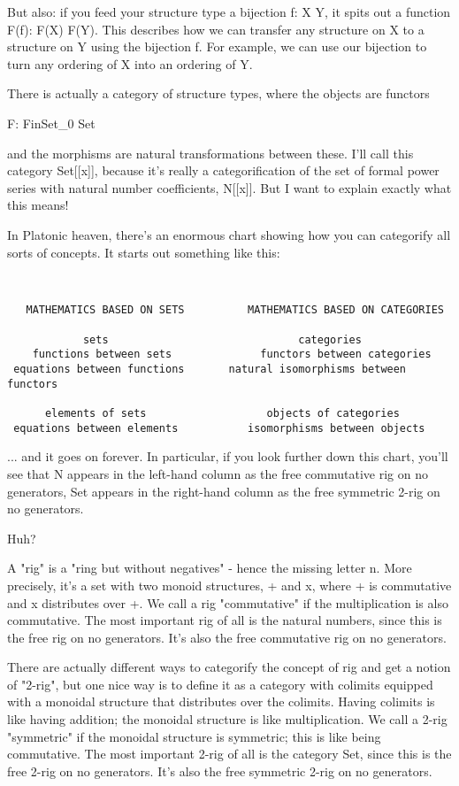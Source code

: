 But also: if you feed your structure type a bijection f: X \to  Y,
it spits out a function F(f): F(X) \to  F(Y).  This describes how
we can transfer any structure on X to a structure on Y using the
bijection f.  For example, we can use our bijection to turn any 
ordering of X into an ordering of Y.

There is actually a category of structure types, where the objects 
are functors 

F: FinSet_{0} \to  Set

and the morphisms are natural transformations between these.   I'll 
call this category Set[[x]], because it's really a categorification of 
the set of formal power series with natural number coefficients, N[[x]]. 
But I want to explain exactly what this means!

In Platonic heaven, there's an enormous chart showing how you can
categorify all sorts of concepts.  It starts out something like this:


\begin{verbatim}


   MATHEMATICS BASED ON SETS          MATHEMATICS BASED ON CATEGORIES

            sets                              categories
    functions between sets              functors between categories
 equations between functions       natural isomorphisms between functors

      elements of sets                   objects of categories
 equations between elements           isomorphisms between objects

\end{verbatim}
    
... and it goes on forever.  In particular, if you look further down
this chart, you'll see that N appears in the left-hand column as the
free commutative rig on no generators, Set appears in the right-hand
column as the free symmetric 2-rig on no generators.

Huh?

A "rig" is a "ring but without negatives" - hence the missing letter n.
More precisely, it's a set with two monoid structures, + and x, where +
is commutative and x distributes over +.   We call a rig "commutative" 
if the multiplication is also commutative.  The most important rig of all
is the natural numbers, since this is the free rig on no generators.
It's also the free commutative rig on no generators.

There are actually different ways to categorify the concept of rig and
get a notion of "2-rig", but one nice way is to define it as a category
with colimits equipped with a monoidal structure that distributes over
the colimits.  Having colimits is like having addition; the monoidal
structure is like multiplication.  We call a 2-rig "symmetric" if the
monoidal structure is symmetric; this is like being commutative.  The
most important 2-rig of all is the category Set, since this is the free
2-rig on no generators.  It's also the free symmetric 2-rig on no
generators.


